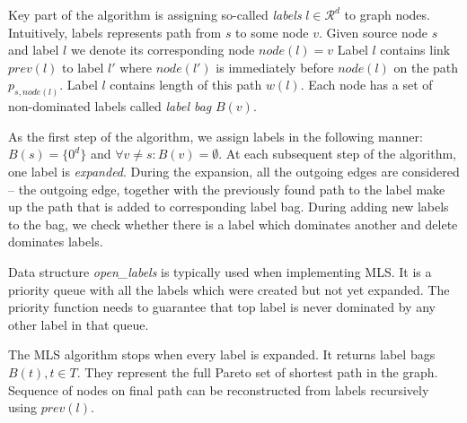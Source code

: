 Key part of the algorithm is assigning so-called \emph{labels} $l\in \mathcal{R}^d$ to graph nodes.
Intuitively, labels represents path from $s$ to some node $v$.
Given source node $s$ and label $l$ we denote its corresponding node $node(l)=v$
Label $l$ contains link $prev(l)$ to label $l'$ where $node(l')$ is immediately before $node(l)$ on the path $p_{s,node(l)}$.
Label $l$ contains length of this path $w(l)$.
Each node has a set of non-dominated labels called \emph{label bag} $B(v)$.

As the first step of the algorithm, we assign labels in the following manner: $B(s)=\{0^d\}$ and $\forall v \ne s: B(v)=\emptyset$.
At each subsequent step of the algorithm, one label is \emph{expanded}. 
During the expansion, all the outgoing edges are considered -- the outgoing edge, together with the previously found path to the label make up the path that is added to corresponding label bag. 
During adding new labels to the bag, we check whether there is a label which dominates another and delete dominates labels.

Data structure {\em open\_labels} is typically used when implementing MLS. It is a priority queue with all the labels which were created but not yet expanded. The priority function needs to guarantee that top label is never dominated by any other label in that queue.

The MLS algorithm stops when every label is expanded. It returns label bags $B(t), t \in T$. 
They represent the full Pareto set of shortest path in the graph.
Sequence of nodes on final path can be reconstructed from labels recursively using $prev(l)$.

